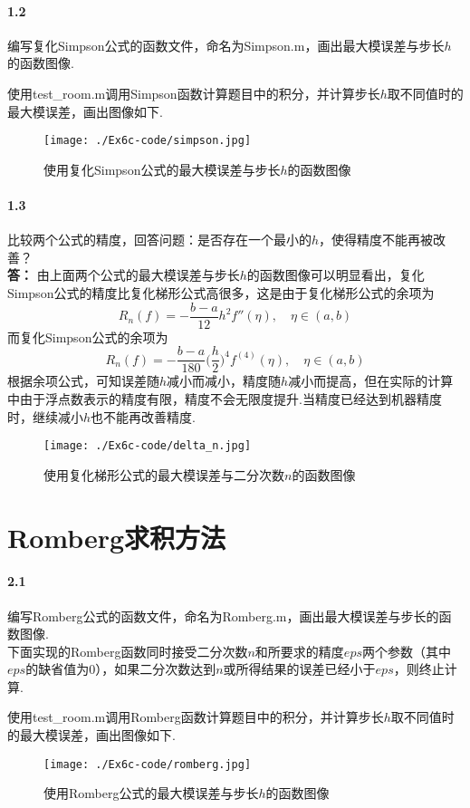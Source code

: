 \paragraph{1.2} 编写复化Simpson公式的函数文件，命名为Simpson.m，画出最大模误差与步长$h$的函数图像.

使用test\_room.m调用Simpson函数计算题目中的积分，并计算步长$h$取不同值时的最大模误差，画出图像如下.
\begin{figure}[H]
  \begin{center}
    \texttt{[image: ./Ex6c-code/simpson.jpg]}
    \caption{使用复化Simpson公式的最大模误差与步长$h$的函数图像}
  \end{center}
\end{figure}
\paragraph{1.3} 比较两个公式的精度，回答问题：是否存在一个最小的$h$，使得精度不能再被改善？\\
\textbf{答：} 由上面两个公式的最大模误差与步长$h$的函数图像可以明显看出，复化Simpson公式的精度比复化梯形公式高很多，这是由于复化梯形公式的余项为
\[R_n(f) = -\frac{b - a}{12} h^2 f''(\eta), \quad \eta \in (a, b)\]
而复化Simpson公式的余项为
\[R_n(f) = -\frac{b - a}{180} \Big(\frac{h}{2}\Big)^4 f^{(4)}(\eta), \quad \eta \in (a, b)\]
根据余项公式，可知误差随$h$减小而减小，精度随$h$减小而提高，但在实际的计算中由于浮点数表示的精度有限，精度不会无限度提升.当精度已经达到机器精度时，继续减小$h$也不能再改善精度.
\begin{figure}[H]
  \begin{center}
    \texttt{[image: ./Ex6c-code/delta\_n.jpg]}
    \caption{使用复化梯形公式的最大模误差与二分次数$n$的函数图像}
  \end{center}
\end{figure}

\section{Romberg求积方法}
\paragraph{2.1} 编写Romberg公式的函数文件，命名为Romberg.m，画出最大模误差与步长的函数图像.\\
下面实现的Romberg函数同时接受二分次数$n$和所要求的精度$eps$两个参数（其中$eps$的缺省值为0），如果二分次数达到$n$或所得结果的误差已经小于$eps$，则终止计算.

使用test\_room.m调用Romberg函数计算题目中的积分，并计算步长$h$取不同值时的最大模误差，画出图像如下.
\begin{figure}[H]
  \begin{center}
    \texttt{[image: ./Ex6c-code/romberg.jpg]}
    \caption{使用Romberg公式的最大模误差与步长$h$的函数图像}
  \end{center}
\end{figure}

